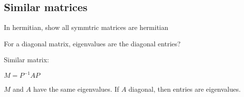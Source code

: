 
\subsection{Similar matrices}

In hermitian, show all symmtric matrices are hermitian

For a diagonal matrix, eigenvalues are the diagonal entries?

Similar matrix:

\(M=P^{-1}AP\)

\(M\) and \(A\) have the same eigenvalues. If \(A\) diagonal, then entries are eigenvalues.

